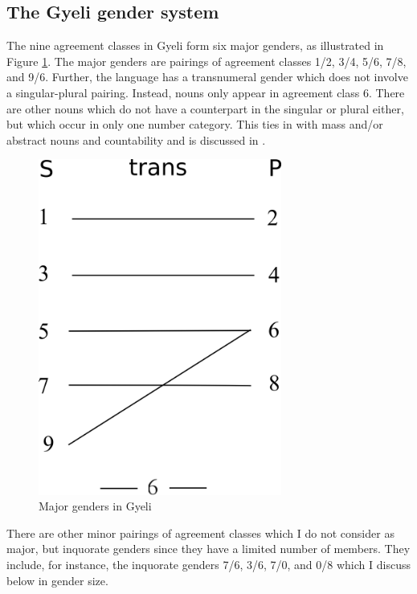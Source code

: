 \subsection{The Gyeli gender system}
\label{sec:genders}

The nine agreement classes in Gyeli form six major genders, as illustrated in Figure \ref{Fig:Gender}. The major genders are pairings of agreement classes 1/2, 3/4, 5/6, 7/8, and 9/6. Further, the language has a transnumeral gender which does not involve a singular-plural pairing. Instead, nouns only appear in agreement class 6.
There are other nouns which do not have a counterpart in the singular or plural either, but which occur in only one number category.  This ties in with mass and/or abstract nouns and countability and is discussed in .

\begin{figure} 
\centering
\includegraphics[width=8cm]{figures/Gyeli-gender-system.png}
\caption{Major genders in Gyeli}
\label{Fig:Gender}
\end{figure}

 There are other minor pairings of agreement classes which I do not consider as major, but inquorate genders since they have a limited number of members. They include, for instance, the inquorate genders 7/6, 3/6, 7/0, and 0/8 which I discuss below in gender size.


